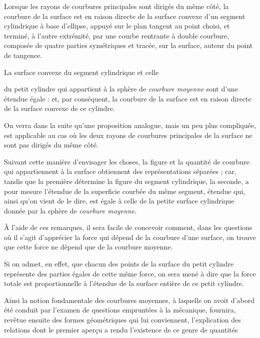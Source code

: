 \documentclass[11pt,a4paper]{article}
\begin{document}
Lorsque les rayons de courbures principales sont dirigés du même côté, la
courbure de la surface est en raison directe de la surface convexe d'un
segment cylindrique à base d'ellipse, appuyé sur le plan tangent au point
choisi, et terminé, à l'autre extrémité, par une courbe rentrante à double
courbure, composée de quatre parties symétriques et tracée, sur la surface,
autour du point de tangence.

La surface convexe du segment cylindrique et celle

du petit cylindre qui appartient à la sphère de \emph{courbure moyenne} sont
d'une étendue égale : et, par conséquent, la courbure de la surface est en
raison directe de la surface convexe de ce cylindre.

On verra dans la suite qu'une proposition analogue, mais un peu plus
compliquée, est applicable au cas où les deux rayons de courbures principales
de la surface ne sont pas dirigés du même côté.

Suivant cette manière d'envisager les choses, la figure et la quantité de
courbure qui appartiennent à la surface obtiennent des représentations
séparées ; car, tandis que la première détermine la figure du segment
cylindrique, la seconde, a pour mesure l'étendue de la superficie courbée du
même segment, étendue qui, ainsi qu'on vient de le dire, est égale à celle de
la petite surface cylindrique donnée par la sphère de \emph{courbure
moyenne}.

À l'aide de ces remarques, il sera facile de concevoir comment, dans les
questions où il s'agit d'apprécier la force qui dépend de la courbure d'une
surface, on trouve que cette force ne dépend que de la courbure moyenne.

Si on admet, en effet, que chacun des points de la surface du petit cylindre
représente des parties égales de cette même force, on sera mené à dire que la
force totale est proportionnelle à l'étendue de la surface entière de ce
petit cylindre.

Ainsi la notion fondamentale des courbures moyennes, à laquelle on avoit
d'abord été conduit par l'examen de questions empruntées à la mécanique,
fournira, revêtue ensuite des formes géométriques qui lui conviennent,
l'explication des relations dont le premier aperçu a rendu l'existence de ce
genre de quantités

\end{document}
